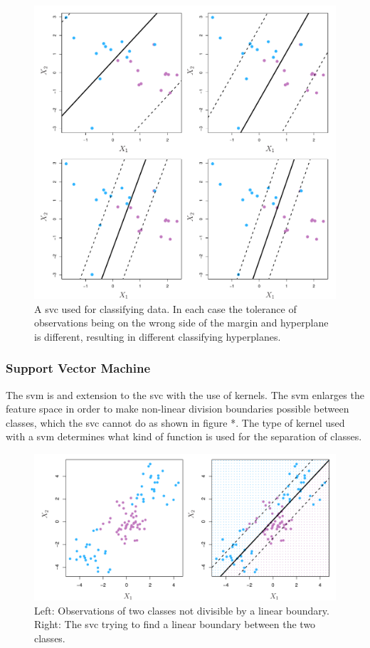 \documentclass[11pt]{article}
\begin{document}
\begin{figure}[ht]
  \centering
  \includegraphics[width=12cm]{graphics/9_7.pdf}
  \caption{A \gls{svc} used for classifying data. In each case the tolerance of observations being on the wrong side of the margin and hyperplane is different, resulting in different classifying hyperplanes.}
\end{figure}

\subsubsection{Support Vector Machine}
The \gls{svm} is and extension to the \gls{svc} with the use of kernels. The \gls{svm} enlarges the feature space in order to make non-linear division boundaries possible between classes, which the \gls{svc} cannot do as shown in figure *. The type of kernel used with a \gls{svm}\cite{KernelMethod2021} determines what kind of function is used for the separation of classes\cite{SVMKernelsScikitlearn24}.\cite{jamesSupportVectorMachines}

\begin{figure}[ht]
  \centering
  \includegraphics[width=12cm]{graphics/9_8.pdf}
  \caption{Left: Observations of two classes not divisible by a linear boundary. Right: The \gls{svc} trying to find a linear boundary between the two classes.}
\end{figure}
\end{document}
